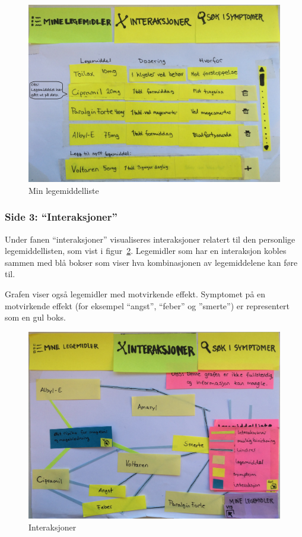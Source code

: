 \begin{figure}[H]
    \centering
    \includegraphics[width=1\textwidth]{fig/utviklingAvPrototype/mineLegemidelerPP.jpg}
    \caption{Min legemiddelliste}
    \label{fig:legemiddellistePP}
\end{figure} 

\subsubsection{Side 3: “Interaksjoner”}
Under fanen “interaksjoner” visualiseres interaksjoner relatert til den personlige legemiddellisten, som vist i figur~\ref{fig:interaksjonsgrafPP}. Legemidler som har en interaksjon kobles sammen med blå bokser som viser hva kombinasjonen av legemiddelene kan føre til. 

Grafen viser også legemidler med motvirkende effekt. Symptomet på en motvirkende effekt (for eksempel “angst”, “feber” og ”smerte”) er representert som en gul boks. 

\begin{figure}[H]
    \centering
    \includegraphics[width=1\textwidth]{fig/utviklingAvPrototype/interaksjonsgrafPP.jpg}
    \caption{Interaksjoner}
    \label{fig:interaksjonsgrafPP}
\end{figure} 


